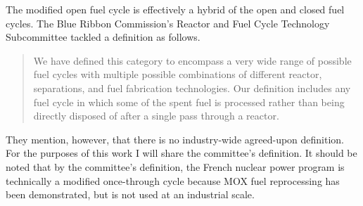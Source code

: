 The modified open fuel cycle is effectively a hybrid of the open and closed fuel
cycles. The Blue Ribbon Commission's Reactor and Fuel Cycle
Technology Subcommittee tackled a definition as follows. 

\begin{quotation}
We have defined this category to encompass a very wide range of possible fuel
cycles with multiple possible combinations of different reactor, separations,
and fuel fabrication technologies. Our definition includes any fuel cycle in
which some of the spent fuel is processed rather than being directly disposed of
after a single pass through a reactor. \cite{brc_reactor_2012}
\end{quotation}

They mention, however, that there is no industry-wide agreed-upon
definition. For the purposes of this work I will share the committee's
definition. It should be noted that by the committee's definition, the French
nuclear power program is technically a modified once-through cycle because MOX
fuel reprocessing has been demonstrated, but is not used at an industrial scale.
